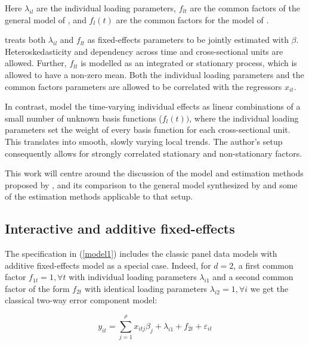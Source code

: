 Here $\lambda_{il}$ are the individual loading parameters, $f_{lt}$ are the common factors of the general model of \citet{bai2009panel},  and $f_{l}(t)$ are the common factors for the model of \citet{kneip2012new}. %

\citet{bai2009panel} treats both $\lambda_{il}$ and $f_{lt}$ as fixed-effects parameters to be jointly estimated with $\beta$. Heteroskedasticity and dependency across time and cross-sectional units are allowed. Further, $f_{lt}$ is modelled as an integrated or stationary process, which is allowed to have a non-zero mean.  Both the individual loading parameters and the common factors parameters are allowed to be correlated with the regressors $x_{it}$.

In contrast,  \citet{kneip2012new} model the time-varying individual effects as linear combinations of a small number of unknown basis functions ($f_l(t))$, where the individual loading parameters set the weight of every basis function for each cross-sectional unit. This translates into smooth, slowly varying local trends. The author's setup consequently allows for strongly correlated stationary and non-stationary factors. %

This work will centre around the discussion of the model and estimation methods proposed by \citet{kneip2012new}, and its comparison to the general model synthesized by \citet{bai2009panel} and some of the estimation methods applicable to that setup. 

\subsection{Interactive and additive fixed-effects}

The specification in (\ref{model1})  includes the classic panel data models with additive fixed-effects model as a special case. Indeed, for $d=2$, a first common factor $f_{1t} = 1, \forall t$ with individual loading parameters $\lambda_{i1}$ and a second common factor of the form $f_{2t}$ with identical loading parameters $\lambda_{i2} = 1,  \forall i$ we get the classical two-way error component model:

\begin{equation*}
      y_{it} = \sum_{j=1}^\rho x_{itj}\beta_j + \lambda_{i1} + f_{2t} + \varepsilon_{it}
\end{equation*}

